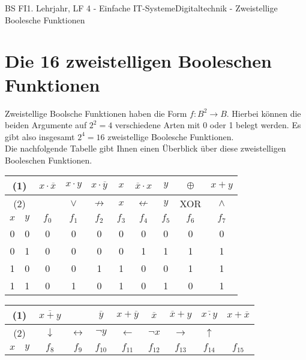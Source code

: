 \documentclass[11pt,oneside,openany,headings=optiontotoc,11pt,numbers=noenddot]{article}
\begin{document}
	\begin{worksheet}{BS FI}{1. Lehrjahr, LF 4 - Einfache IT-Systeme}{Digitaltechnik - Zweistellige Boolesche Funktionen}
		\section{Die 16 zweistelligen Booleschen Funktionen}
		Zweistellige Boolsche Funktionen haben die Form \(f: B^2 \rightarrow B\). Hierbei können die beiden Argumente auf \(2^2 = 4\) verschiedene Arten mit 0 oder 1 belegt werden. Es gibt also insgesamt \(2^4 = 16\) zweistellige Boolesche Funktionen.\\
		Die nachfolgende Tabelle gibt Ihnen einen Überblick über diese zweistelligen Booleschen Funktionen.\\
		\begin{center}
			\begin{tabular}{|cc|c|c|c|c|c|c|c|c|}
				\hline
				\multicolumn{2}{|c|}{(1)} & \(x\cdot\overline{x}\) & \(x\cdot y\) & \(x\cdot\overline{y}\) & \(x\) & \(\overline{x}\cdot x\) & \(y\) & \(\oplus\)& \(x+y\)\\
				\hline
				\multicolumn{2}{|c|}{(2)} & \(\) & \(\lor\) & \(\not\rightarrow\) & \(x\) & \(\not\leftarrow\) & \(y\) & XOR & \(\land\)\\
				\hline
				\(x\) & \(y\) & \(f_0\) & \(f_1\) & \(f_2\) & \(f_3\) & \(f_4\) & \(f_5\) & \(f_6\) & \(f_7\)\\
				\hline
				0 & 0 & 0 & 0 & 0 & 0 & 0 & 0 & 0 & 0\\
				\hline
				0 & 1 & 0 & 0 & 0 & 0 & 1 & 1 & 1 & 1\\
				\hline
				1 & 0 & 0 & 0 & 1 & 1 & 0 & 0 & 1 & 1\\
				\hline
				1 & 1 & 0 & 1 & 0 & 1 & 0 & 1 & 0 & 1\\
				\hline
			\end{tabular}
			\par\bigskip\noindent
			\begin{tabular}{|cc|c|c|c|c|c|c|c|c|}
				\hline
				\multicolumn{2}{|c|}{(1)} & \(\overline{x+y}\) & \(\) & \(\overline{y}\) & \(x + \overline{y}\) & \(\overline{x}\) & \(\overline{x} + y\) & \(\overline{x\cdot y}\) & \(x+\overline{x}\)\\
				\hline
				\multicolumn{2}{|c|}{(2)} & \(\downarrow\) & \(\leftrightarrow\) & \(\neg y\) & \(\leftarrow\) & \(\neg x\) & \(\rightarrow\) & \(\uparrow\) & \\
				\hline
				\(x\) & \(y\) & \(f_8\) & \(f_9\) & \(f_{10}\) & \(f_{11}\) & \(f_{12}\) & \(f_{13}\) & \(f_{14}\) & \(f_{15}\)\\

\end{tabular}
\end{center}
\end{worksheet}
\end{document}
